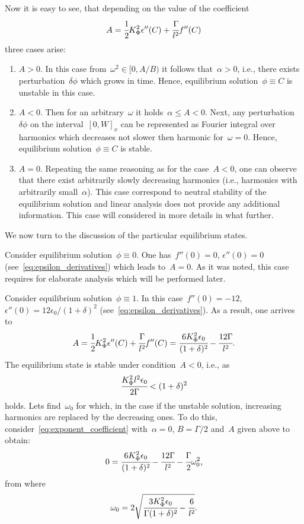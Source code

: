 Now it is easy to see, that depending on the value of the coefficient
$$A = \cfrac{1}{2} K_\Phi^2 \epsilon''(C) + \cfrac{\Gamma}{l^2} f''(C)$$
three cases arise:
%
\begin{enumerate}[label=\arabic*.]
\item $A > 0$. In this case from~$\omega^2 \in [0, A / B)$ it follows
  that~$\alpha > 0$, i.e., there exists perturbation~$\delta \phi$
  which grows in time. Hence, equilibrium solution~$\phi \equiv C$ is
  unstable in this case.
  
\item $A < 0$. Then for an arbitrary~$\omega$ it holds~$\alpha
  \leqslant A < 0$. Next, any perturbation~$\delta \phi$ on the
  interval~$[0, W]_x$ 
  can be represented as Fourier integral over harmonics which decreases
  not slower then harmonic for~$\omega = 0$.
  Hence, equilibrium solution~$\phi \equiv C$ is stable.
  
\item $A = 0$. Repeating the same reasoning as for the case~$A < 0$,
  one can observe that there exist arbitrarily slowly decreasing
  harmonics (i.e., harmonics with arbitrarily small~$\alpha$).
  This case correspond to neutral stability of the equilibrium
  solution and linear analysis does not provide any additional
  information.
  This case will considered in more details in what further.
\end{enumerate}

We now turn to the discussion of the particular equilibrium states.

Consider equilibrium solution~$\phi \equiv 0$.
One has~$f''(0) = 0$, $\epsilon''(0) = 0$
(see~\eqref{eq:epsilon_derivatives})
which leads to~$A = 0$.
As it was noted, this case requires for elaborate analysis which will be
performed later.

Consider equilibrium solution~$\phi \equiv 1$.
In this case~$f''(0) = -12$, $\epsilon''(0) = 12 \epsilon_0 / (1 +
\delta)^2$ (see~\eqref{eq:epsilon_derivatives}).
As a result, one arrives to
$$A = \cfrac{1}{2} K_\Phi^2 \epsilon''(C) + \cfrac{\Gamma}{l^2} f''(C) = \cfrac{6 K_\Phi^2 \epsilon_0}{(1 + \delta)^2} - \cfrac{12 \Gamma}{l^2} {\text{.}}$$
The equilibrium state is stable under condition~$A < 0$, i.e., as 
\begin{equation}
  \cfrac{K_\Phi^2 l^2 \epsilon_0}{2 \Gamma} < (1 + \delta)^2 
  \label{cond:equilibrium_1_stable}
\end{equation}
holds.      
Lets find~$\omega_0$ for which, in the case if the unstable solution,
increasing harmonics are replaced by the decreasing ones.
To do this, consider~\eqref{eq:exponent_coefficient} with~$\alpha =
0$, $B = \Gamma/2$ and~$A$ given above to obtain: 
$$0 = \cfrac{6 K_\Phi^2 \epsilon_0}{(1 + \delta)^2} - \cfrac{12 \Gamma}{l^2} - \cfrac{\Gamma}{2} \omega_0^2 {\text{,}}$$
from where
$$\omega_0 = 2 \sqrt{\cfrac{3 K_\Phi^2 \epsilon_0}{\Gamma (1 + \delta)^2} - \cfrac{6}{l^2}} {\text{.}}$$

